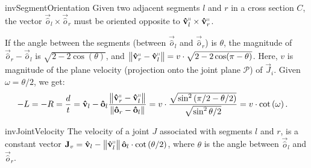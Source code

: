 \begin{restatable}{inv}{SegmentOrientation}
\label{inv:SegmentOrientation}
Given two adjacent segments $l$ and $r$ in a cross section $C$, the vector
$\vec{\hat o}_l\times \vec{\hat o}_r$ must be oriented opposite to $\vec{\hat v}_l^\shortparallel\times \vec{\hat v}_r^\shortparallel$.
\end{restatable}

If the angle between the segments (between $\vec{\hat o}_l$ and $\vec{\hat o}_r$) is $\theta$,
the magnitude of $\vec{\hat o}_r-\vec{\hat o}_l$ is $\sqrt{2-2\cos(\theta)}$,
and $ \left\| \vec{\hat v}_r^\shortparallel-\vec{\hat v}_l^\shortparallel\right\| = v\cdot\sqrt{2-2\cos(\pi-\theta)}$.
Here, $v$ is magnitude of the plane velocity (projection onto the joint plane
$\mathcal P$) of $\vec J_i$.
Given $\omega = \theta/2$, we get:
\begin{align*}
-L = -R &= \frac dt = \vec{\hat v}_l - \vec{\hat o}_l\frac{ \left\| \vec{\hat v}_r^\shortparallel
- \vec{\hat v}_l^\shortparallel\right\|}{ \left\| \vec{\hat o}_r-\vec{\hat o}_l\right\|}
= v\cdot\frac{\sqrt{\sin^2\left( {\pi/2-\theta/2}\right)}}{\sqrt{\sin^2{\theta/2}}}
= v\cdot\cot\left( \omega \right).
\end{align*}

\begin{restatable}{inv}{JointVelocity}
\label{inv:joint_velocity}
The velocity of a joint $J$ associated with segments $l$ and $r$, is a constant vector
$\vec J_v
= \vec{\hat v}_l - \left\| \vec{\hat v}_l^\shortparallel\right\|\vec{\hat o}_l\cdot\cot\left( \theta/2 \right)$,
where $\theta$ is the angle between $\vec{\hat o}_l$ and $\vec{\hat o}_r$.
\end{restatable}

